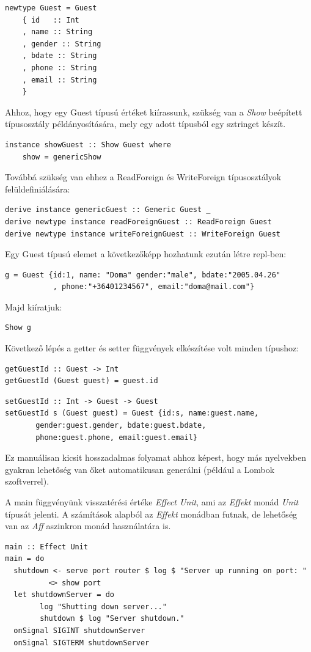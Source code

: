 \documentclass[12pt]{article}
\begin{document}
\begin{verbatim}
newtype Guest = Guest
    { id   :: Int
    , name :: String
    , gender :: String
    , bdate :: String
    , phone :: String
    , email :: String
    }
\end{verbatim}
Ahhoz, hogy egy Guest típusú értéket kiírassunk, szükség van a \textit{Show} beépített típusosztály példányosítására, mely egy adott típusból egy sztringet készít.
\begin{verbatim}
instance showGuest :: Show Guest where
    show = genericShow
\end{verbatim}
Továbbá szükség van ehhez a ReadForeign és WriteForeign típusosztályok felüldefiniálására:
\begin{verbatim}
derive instance genericGuest :: Generic Guest _
derive newtype instance readForeignGuest :: ReadForeign Guest
derive newtype instance writeForeignGuest :: WriteForeign Guest
\end{verbatim}
Egy Guest típusú elemet a következőképp hozhatunk ezután létre repl-ben:
\begin{verbatim}
g = Guest {id:1, name: "Doma" gender:"male", bdate:"2005.04.26"
           , phone:"+36401234567", email:"doma@mail.com"}
\end{verbatim}
Majd kiíratjuk:
\begin{verbatim}
Show g
\end{verbatim}
Következő lépés a getter és setter függvények elkészítése volt minden típushoz:
\begin{verbatim}
getGuestId :: Guest -> Int
getGuestId (Guest guest) = guest.id
\end{verbatim}

\begin{verbatim}
setGuestId :: Int -> Guest -> Guest
setGuestId s (Guest guest) = Guest {id:s, name:guest.name, 
       gender:guest.gender, bdate:guest.bdate,
       phone:guest.phone, email:guest.email}
\end{verbatim}
Ez manuálisan kicsit hosszadalmas folyamat ahhoz képest, hogy más nyelvekben gyakran lehetőség van őket automatikusan generálni (például a Lombok szoftverrel). 

A main függvényünk visszatérési értéke \textit{Effect Unit}, ami az \textit{Effekt} monád \textit{Unit} típusát jelenti.  A számítások alapból az \textit{Effekt} monádban futnak, de lehetőség van az \textit{Aff} aszinkron monád használatára is.
\begin{verbatim}
main :: Effect Unit
main = do
  shutdown <- serve port router $ log $ "Server up running on port: "
          <> show port
  let shutdownServer = do
        log "Shutting down server..."
        shutdown $ log "Server shutdown."
  onSignal SIGINT shutdownServer
  onSignal SIGTERM shutdownServer
\end{verbatim}
\end{document}
